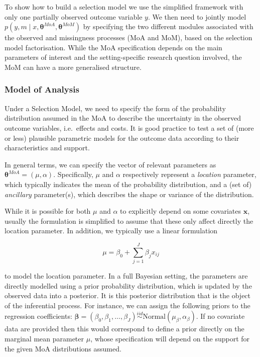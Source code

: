 \documentclass[]{article}
\begin{document}
To show how to build a selection model we use the simplified framework
with only one partially observed outcome variable \(y\). We then need to
jointly model \(p(y,m\mid x,\bm{\theta}^{MoA},\bm{\theta}^{MoM})\) by
specifying the two different modules associated with the observed and
missingness processes (MoA and MoM), based on the selection model
factorisation. While the MoA specification depends on the main
parameters of interest and the setting-specific research question
involved, the MoM can have a more generalised structure.

\subsubsection{\texorpdfstring{Model of
Analysis\label{MoA}}{Model of Analysis}}\label{model-of-analysis}

Under a Selection Model, we need to specify the form of the probability
distribution assumed in the MoA to describe the uncertainty in the
observed outcome variables, i.e.~effects and costs. It is good practice
to test a set of (more or less) plausible parametric models for the
outcome data according to their characteristics and support.

In general terms, we can specify the vector of relevant parameters as
\(\bm{\theta}^{MoA}=(\mu,\alpha)\). Specifically, \(\mu\) and \(\alpha\)
respectively represent a \textit{location} parameter, which typically
indicates the mean of the probability distribution, and a (set of)
\textit{ancillary} parameter(s), which describes the shape or variance
of the distribution.

While it is possible for both \(\mu\) and \(\alpha\) to explicitly
depend on some covariates \(\bm{x}\), usually the formulation is
simplified to assume that these only affect directly the location
parameter. In addition, we typically use a linear formulation

\begin{equation}\label{meanreg}
\mu=\beta_{0}+\sum_{j=1}^{J}{\beta_{j}x_{ij}}
\end{equation}

to model the location parameter. In a full Bayesian setting, the
parameters are directly modelled using a prior probability distribution,
which is updated by the observed data into a posterior. It is this
posterior distribution that is the object of the inferential process.
For instance, we can assign the following priors to the regression coefficients:
\(\bm{\beta}=(\beta_{0},\beta_{1},\ldots,\beta_{J}) \overset{iid}\sim \mbox{Normal}(\mu_{\beta},\alpha_{\beta})\).
If no covariate data are provided then this would correspond to define a
prior directly on the marginal mean parameter \(\mu\), whose
specification will depend on the support for the given MoA distributions
assumed.
\end{document}
